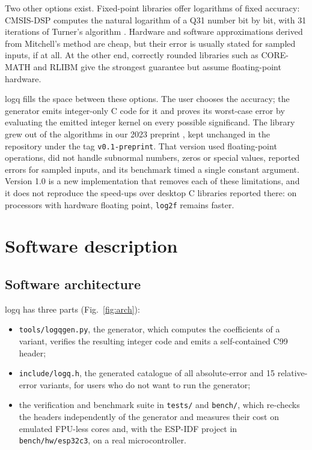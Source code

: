 \documentclass[preprint,12pt]{elsarticle}
\begin{document}
Two other options exist. Fixed-point libraries offer logarithms of fixed
accuracy: CMSIS-DSP computes the natural logarithm of a Q31 number bit by bit,
with 31 iterations of Turner's algorithm \cite{cmsisdsp,turner2010}. Hardware
and software approximations derived from Mitchell's method
\cite{mitchell1962} are cheap, but their error is usually stated for sampled
inputs, if at all. At the other end, correctly rounded libraries such as
CORE-MATH and RLIBM \cite{sibidanov2022coremath,lim2021rlibm32} give the
strongest guarantee but assume floating-point hardware.

logq fills the space between these options. The user chooses the accuracy;
the generator emits integer-only C code for it and proves its worst-case
error by evaluating the emitted integer kernel on every possible significand.
The library grew out of the algorithms in our 2023 preprint
\cite{gepner2023preprint}, kept unchanged in the repository under the tag
\texttt{v0.1-preprint}. That version used floating-point operations,
did not handle subnormal numbers, zeros or special values, reported errors for
sampled inputs, and its benchmark timed a single constant argument. Version
1.0 is a new implementation that removes each of these limitations, and it
does not reproduce the speed-ups over desktop C libraries reported there:
on processors with hardware floating point, \texttt{log2f} remains faster.

\section{Software description}

\subsection{Software architecture}

logq has three parts (Fig.~\ref{fig:arch}):
\begin{itemize}
\item \texttt{tools/logqgen.py}, the generator, which computes the
  coefficients of a variant, verifies the resulting integer code and emits a
  self-contained C99 header;
\item \texttt{include/logq.h}, the generated catalogue of all
  \numnvariants{} absolute-error and 15 relative-error variants, for users who
  do not want to run the generator;
\item the verification and benchmark suite in \texttt{tests/} and
  \texttt{bench/}, which re-checks the headers independently of the generator
  and measures their cost on emulated FPU-less cores and, with the ESP-IDF
  project in \texttt{bench/hw/esp32c3}, on a real microcontroller.
\end{itemize}
\end{document}
